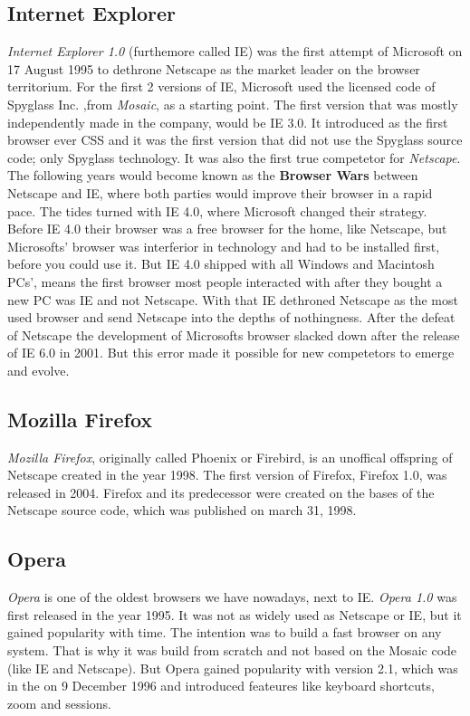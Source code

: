 \documentclass[runningheads]{llncs}
\begin{document}
		\subsection{Internet Explorer}
		\textit{Internet Explorer 1.0} (furthemore called IE) was the first attempt of Microsoft on 17 August 1995 to dethrone Netscape as the market leader on the browser territorium. For the first 2 versions of IE, Microsoft used the licensed code of Spyglass Inc. ,from \textit{Mosaic}, as a starting point. The first version that was mostly independently made in the company, would be IE 3.0. It introduced as the first browser ever CSS and it was the first version that did not use the Spyglass source code; only Spyglass technology. It was also the first true competetor for \textit{Netscape}. The following years would become known as the \textbf{Browser Wars} between Netscape and IE, where both parties would improve their browser in a rapid pace. The tides turned with IE 4.0, where Microsoft changed their strategy. Before IE 4.0 their browser was a free browser for the home, like Netscape, but Microsofts' browser was interferior in technology and had to be installed first, before you could use it. But IE 4.0 shipped with all Windows and Macintosh PCs', means the first browser most people interacted with after they bought a new PC was IE and not Netscape. With that IE dethroned Netscape as the most used browser and send Netscape into the depths of nothingness. After the defeat of Netscape the development of Microsofts browser slacked down after the release of IE 6.0 in 2001. But this error made it possible for new competetors to emerge and evolve.
		\subsection{Mozilla Firefox}
		\textit{Mozilla Firefox}, originally called Phoenix or Firebird, is an unoffical offspring of Netscape created in the year 1998. The first version of Firefox, Firefox 1.0, was released in 2004. Firefox and its predecessor were created on the bases of the Netscape source code, which was published on march 31, 1998. 
		\subsection{Opera}
		\textit{Opera} is one of the oldest browsers we have nowadays, next to IE. \textit{Opera 1.0} was first released in the year 1995. It was not as widely used as Netscape or IE, but it gained popularity with time. The intention was to build a fast browser on any system. That is why it was build from scratch and not based on the Mosaic code (like IE and Netscape). But Opera gained popularity with version 2.1, which was in the on 9 December 1996 and introduced feateures like keyboard shortcuts, zoom and sessions.
\end{document}
